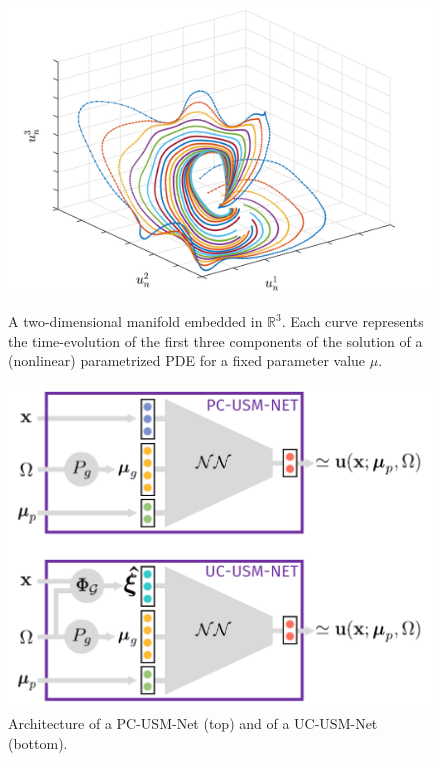 \documentclass[11pt]{article}
\begin{document}
\begin{figure}
\centering
\begin{minipage}{.47\textwidth}
  \includegraphics[width=1.\linewidth]{imgs/manifold.png}
  \caption{A two-dimensional manifold embedded in $\mathbb R^3$. Each curve represents the time-evolution of the first
three components of the solution of a (nonlinear) parametrized PDE for a fixed parameter value $\mu$.}
    \label{fig:manifold}
\end{minipage}%
\hfill
\begin{minipage}{.47\textwidth}
  \includegraphics[width=1.0\textwidth]{imgs/usm-net-original.png}
    \caption{Architecture of a PC-USM-Net (top) and of a UC-USM-Net
(bottom).}
    \label{fig:usm-net}
\end{minipage}
\end{figure}
\end{document}
